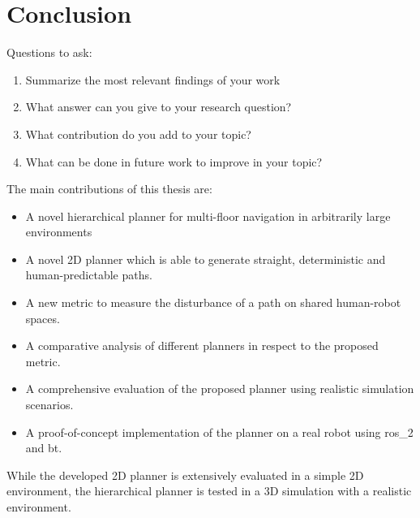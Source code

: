 \chapter{Conclusion}
\label{sec:conclusion}
Questions to ask:
\begin{enumerate}
    \item Summarize the most relevant findings of your work
    \item What answer can you give to your research question?
    \item What contribution do you add to your topic?
    \item What can be done in future work to improve in your topic?
\end{enumerate}


The main contributions of this thesis are:
\begin{itemize}
    \item A novel hierarchical planner for multi-floor navigation in arbitrarily large environments
    \item A novel 2D planner which is able to generate straight, deterministic and human-predictable paths.
    \item A new metric to measure the disturbance of a path on shared human-robot spaces.
    \item A comparative analysis of different planners in respect to the proposed metric.
    \item A comprehensive evaluation of the proposed planner using realistic simulation scenarios.
    \item A proof-of-concept implementation of the planner on a real robot using \gls{ros_2} and \gls{bt}.
\end{itemize}

While the developed 2D planner is extensively evaluated in a simple 2D environment, the hierarchical planner is tested in a 3D simulation with a realistic environment.
